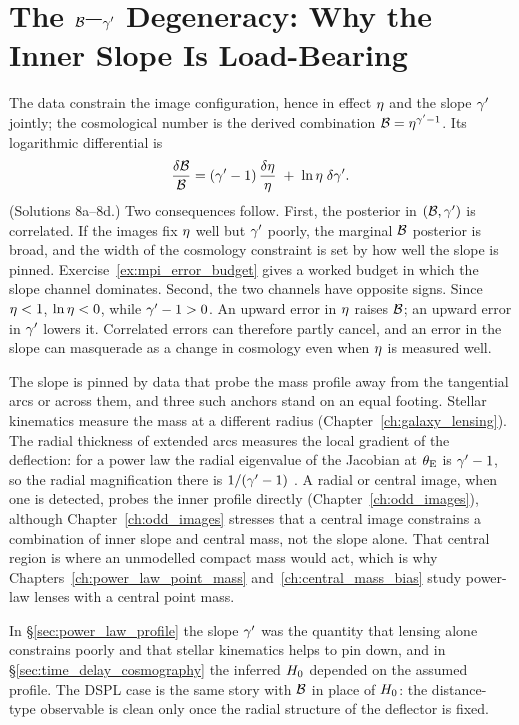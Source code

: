 \section[The $\Brat$--$\gp$ Degeneracy]{The $\Brat$--$\gp$ Degeneracy: Why the Inner Slope Is Load-Bearing}
\label{sec:mpi_degeneracy}

The data constrain the image configuration, hence in effect $\eta$
and the slope $\gp$ jointly; the cosmological number is the derived
combination $\mathcal{B}=\eta^{\gamma'-1}$.  Its logarithmic differential is
\begin{equation}
  \frac{\delta\mathcal{B}}{\mathcal{B}}
  = (\gamma'-1)\,\frac{\delta\eta}{\eta}
  \;+\; \ln\eta\;\delta\gamma' .
  \label{eq:mpi_twochannel}
\end{equation}
(Solutions 8a--8d.)  Two consequences follow.  First, the posterior in
$(\mathcal{B},\gamma')$ is correlated.  If the
images fix $\eta$ well but $\gp$ poorly, the marginal $\Brat$
posterior is broad, and the width of the cosmology constraint is set
by how well the slope is pinned.
Exercise~\ref{ex:mpi_error_budget} gives a worked budget in which
the slope channel dominates.  Second, the two channels have opposite
signs.  Since
$\eta<1$, $\ln\eta<0$, while $\gamma'-1>0$.  An upward error in
$\eta$ raises $\Brat$; an upward error in $\gp$ lowers it.
Correlated errors can therefore partly cancel, and an error in the
slope can masquerade as a change in cosmology even when $\eta$
is measured well.

The slope is pinned by data that probe the mass profile away from the
tangential arcs or across them, and three such anchors stand on an equal
footing.  Stellar kinematics measure the mass at a different radius
(Chapter~\ref{ch:galaxy_lensing}).  The radial thickness of extended
arcs measures the local gradient of the deflection: for a power law the
radial eigenvalue of the Jacobian at $\theta_{\mathrm{E}}$ is $\gamma'-1$, so the radial
magnification there is $1/(\gamma'-1)$ .  A radial or
central image, when one is detected, probes the inner profile directly
(Chapter~\ref{ch:odd_images}), although Chapter~\ref{ch:odd_images}
stresses that a central image constrains a combination of inner
slope and central mass, not the slope alone.  That central region is
where an unmodelled compact mass would act, which is why
Chapters~\ref{ch:power_law_point_mass} and~\ref{ch:central_mass_bias}
study power-law lenses with a central point mass.

\begin{bridge}
In \S\ref{sec:power_law_profile} the slope $\gp$ was the quantity that
lensing alone constrains poorly and that stellar kinematics helps to
pin down, and in \S\ref{sec:time_delay_cosmography} the inferred
$H_0$ depended on the assumed profile.  The DSPL case is the same
story with $\Brat$ in place of $H_0$: the distance-type observable is
clean only once the radial structure of the deflector is fixed.
\end{bridge}


